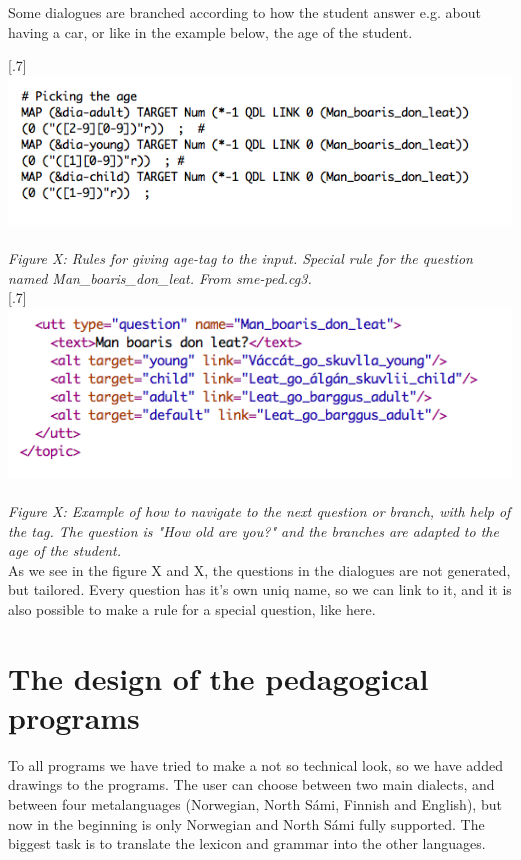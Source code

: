 \documentclass[a4paper,12pt]{article}
\begin{document}
Some dialogues are branched according to how the student answer e.g. about having a car, or like in the example below, the age of the student.


\scalebox{.7}[.7]{\includegraphics{img/picking_age.png}}\\
\\
\textit{Figure X: Rules for giving age-tag to the input. Special rule for the question named Man\_boaris\_don\_leat. From sme-ped.cg3.}\\


\scalebox{.7}[.7]{\includegraphics{img/Man_boaris.png}}\\
\\
\textit{Figure X: Example of how to navigate to the next question or branch, with help of the tag.  The question is "How old are you?" and the branches are adapted to the age of the student.}\\

As we see in the figure X and X, the questions in the dialogues are not generated, but tailored. Every question has it's own uniq name, so we can link to it, and it is also possible to make a rule for a special question, like here.  

\section{The design of the pedagogical programs}
To all programs we have tried to make a not so technical look, so we have added drawings to the programs. The user can choose between two main dialects, and between four metalanguages (Norwegian, North Sámi, Finnish and English), but now in the beginning is only Norwegian and North Sámi fully supported. The biggest task is to translate the lexicon and grammar into the other languages.  
\end{document}
